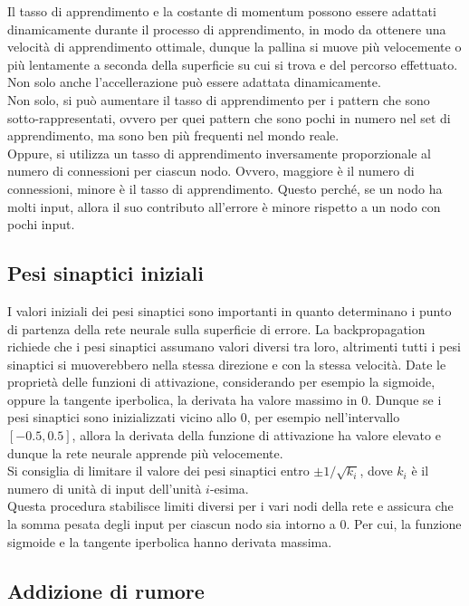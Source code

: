 Il tasso di apprendimento e la costante di momentum possono essere adattati
dinamicamente durante il processo di apprendimento, in modo da ottenere una
velocità di apprendimento ottimale, dunque la pallina si muove più velocemente o
più lentamente a seconda della superficie su cui si trova e del percorso
effettuato. Non solo anche l'accellerazione può essere adattata
dinamicamente.\\
Non solo, si può aumentare il tasso di apprendimento per i pattern che sono
sotto-rappresentati, ovvero per quei pattern che sono pochi in numero nel set di
apprendimento, ma sono ben più frequenti nel mondo reale.\\
Oppure, si utilizza un tasso di apprendimento inversamente proporzionale al
numero di connessioni per ciascun nodo. Ovvero, maggiore è il numero di
connessioni, minore è il tasso di apprendimento. Questo perché, se un nodo ha
molti input, allora il suo contributo all'errore è minore rispetto a un nodo con
pochi input.\\

\subsection{Pesi sinaptici iniziali}

I valori iniziali dei pesi sinaptici sono importanti in quanto determinano i
punto di partenza della rete neurale sulla superficie di errore. La
backpropagation richiede che i pesi sinaptici assumano valori diversi tra loro,
altrimenti tutti i pesi sinaptici si muoverebbero nella stessa direzione e con
la stessa velocità. Date le proprietà delle funzioni di attivazione,
considerando per esempio la sigmoide, oppure la tangente iperbolica, la derivata
ha valore massimo in $0$. Dunque se i pesi sinaptici sono inizializzati vicino
allo 0, per esempio nell'intervallo $[-0.5, 0.5]$, allora la derivata della
funzione di attivazione ha valore elevato e dunque la rete neurale apprende più
velocemente.\\
Si consiglia di limitare il valore dei pesi sinaptici entro $\pm 1 /
	\sqrt{k_i}$, dove $k_i$ è il numero di unità di input dell'unità $i$-esima.\\
Questa procedura stabilisce limiti diversi per i vari nodi della rete e assicura
che la somma pesata degli input per ciascun nodo sia intorno a 0. Per cui, la
funzione sigmoide e la tangente iperbolica hanno derivata massima.

\subsection{Addizione di rumore}

